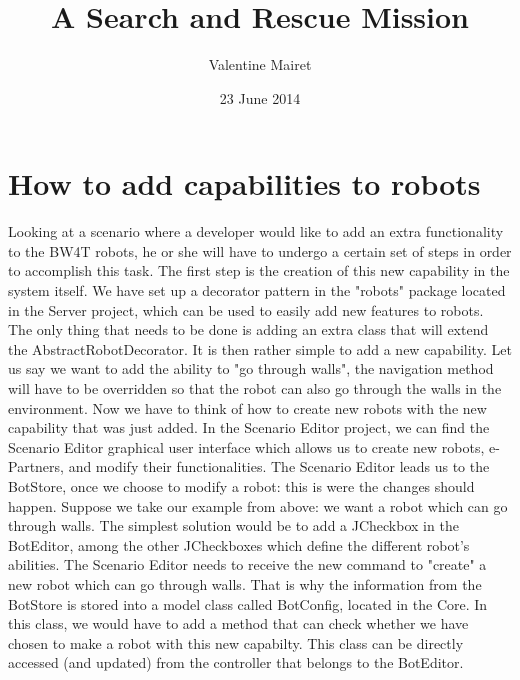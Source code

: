 \documentclass{article}
\title{A Search and Rescue Mission}
\author{Valentine Mairet}
\date{23 June 2014}
\begin{document}
\maketitle

\section*{How to add capabilities to robots}
Looking at a scenario where a developer would like to add an extra functionality to the BW4T robots, he or she will have to undergo a certain set of steps in order to accomplish this task. 
\newline
The first step is the creation of this new capability in the system itself. We have set up a decorator pattern in the "robots" package located in the Server project, which can be used to easily add new features to robots. The only thing that needs to be done is adding an extra class that will extend the AbstractRobotDecorator. It is then rather simple to add a new capability. 
\newline
Let us say we want to add the ability to "go through walls", the navigation method will have to be overridden so that the robot can also go through the walls in the environment. 
\newline
\newline
Now we have to think of how to create new robots with the new capability that was just added. In the Scenario Editor project, we can find the Scenario Editor graphical user interface which allows us to create new robots, e-Partners, and modify their functionalities. 
\newline
The Scenario Editor leads us to the BotStore, once we choose to modify a robot: this is were the changes should happen. Suppose we take our example from above: we want a robot which can go through walls. The simplest solution would be to add a JCheckbox in the BotEditor, among the other JCheckboxes which define the different robot's abilities. 
\newline
The Scenario Editor needs to receive the new command to "create" a new robot which can go through walls. That is why the information from the BotStore is stored into a model class called BotConfig, located in the Core. In this class, we would have to add a method that can check whether we have chosen to make a robot with this new capabilty. This class can be directly accessed (and updated) from the controller that belongs to the BotEditor. 

\pagebreak
\end{document}
